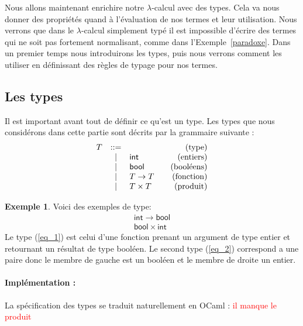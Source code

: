 \documentclass {article}
\makeatletter
\newcommand{\codefrom}[3]
           {}
\theoremstyle{definition}
\newtheorem{example}{Exemple}
\theoremstyle{remark}
\newcommand{\todo}[1]{\textcolor{red}{#1}}
\newenvironment{bnf}
               {\[\begin{array}{lcl@{\qquad}r}}
               {\end{array}\]}
\makeatother
\begin{document}
Nous allons maintenant enrichire notre $\lambda$-calcul avec des
types. Cela va nous donner des propriétés quand à l'évaluation de nos
termes et leur utilisation. Nous verrons que dans le $\lambda$-calcul
simplement typé il est impossible d'écrire des termes qui ne soit pas
fortement normalisant, comme dans l'Exemple~\ref{paradoxe}. Dans un
premier temps nous introduirons les types, puis nous verrons comment
les utiliser en définissant des règles de typage pour nos termes.


\subsection{Les types}
\label{simple_type}


\newcommand{\intg}{\ensuremath{\mathsf{int}}}
\newcommand{\bool}{\ensuremath{\mathsf{bool}}}

Il est important avant tout de définir ce qu'est un type. Les types
que nous considérons dans cette partie sont décrits par la grammaire
suivante :
%
\begin{bnf}
  T &::=& &\mbox{(type)}\\
  &|& \intg{} &\mbox{(entiers)}\\ 
  &|& \bool{} &\mbox{(booléens)}\\
  &|& T \rightarrow T &\mbox{(fonction)}\\
  &|& T \times T &\mbox{(produit)}\\
\end{bnf}

\begin{example}
  Voici des exemples de type:
  \begin{eqnarray}
    \intg \rightarrow \bool  \label{eq_1}  \\
    \bool \times \intg \label{eq_2} 
  \end{eqnarray}
  Le type (\ref{eq_1}) est celui d'une fonction prenant un argument de type entier et 
  retournant un résultat de type booléen.
  Le second type (\ref{eq_2}) correspond a une paire donc le membre de gauche est un booléen
  et le membre de droite un entier.
\end{example}

\paragraph{Implémentation :}

La spécification des types se traduit naturellement en OCaml : \todo{il manque le produit}
%
\codefrom{typed}{lambda}{Type}
\end{document}
